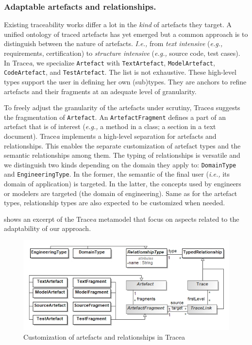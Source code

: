 \subsubsection{Adaptable artefacts and relationships.}
Existing traceability works differ a lot in the \textit{kind} of artefacts they target. A unified ontology of traced artefacts has yet emerged but a common approach is to distinguish between the nature of artefacts. \textit{I.e.,} from \textit{text intensive} (\textit{e.g.,} requirements, certification) to \textit{structure intensive} (\textit{e.g.,} source code, test cases).  
In Trace\textit{a}, we specialize \texttt{Artefact} with \texttt{TextArtefact}, \texttt{ModelArtefact}, \texttt{CodeArtefact}, and \texttt{TestArtefact}. 
The list is not exhaustive. These high-level types support the user in defining her own (sub)types. They are anchors to refine artefacts and their fragments at an adequate level of granularity.  

To freely adjust the granularity of the artefacts under scrutiny, Trace\textit{a} suggests the fragmentation of \texttt{Artefact}. An \texttt{ArtefactFragment} defines a part of an artefact that is of interest (\textit{e.g.,} a method in a class; a section in a text document). 
Trace\textit{a} implements a high-level separation for artefacts and relationships. This enables the separate customization of artefact types and the semantic relationships among them. The typing of relationships is versatile and we distinguish two kinds depending on the domain they apply to: \texttt{DomainType} and \texttt{EngineeringType}. In the former, the semantic of the final user (\textit{i.e.,} its domain of application) is targeted. In the latter, the concepts used by engineers or modelers are targeted (the domain of engineering). Same as for the artefact types, relationship types are also expected to be customized \cite{Olive02} when needed.

 shows an excerpt of the Trace\textit{a} metamodel that focus on aspects related to the adaptability of our approach.
\begin{figure}[ht]   
	\centering  
		\vspace{-0.4truecm}

	\includegraphics[width=.9\linewidth]{images/customization.jpg}
	\caption{Customization of artefacts and relationships in Tracea}
	\label{fig:customization}
\end{figure}

